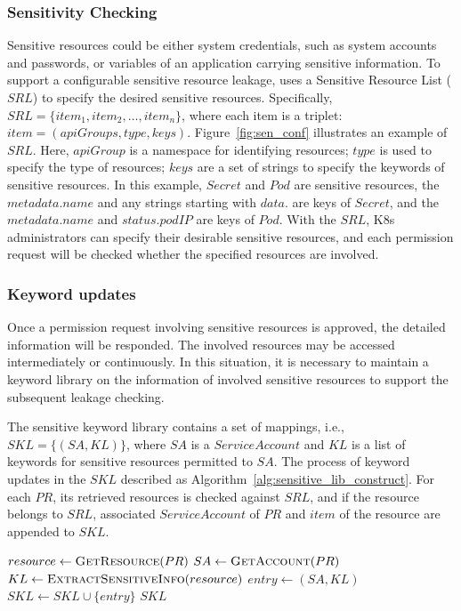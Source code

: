 \documentclass[conference]{IEEEtran}
\theoremstyle{definition}
\begin{document}
\subsubsection{Sensitivity Checking} Sensitive resources could be either system credentials, such as system accounts and passwords, or variables of an application carrying sensitive information. To support a configurable sensitive resource leakage, \kg uses a Sensitive Resource List ($SRL$) to specify the desired sensitive resources. Specifically, $SRL = \{item_1, item_2, \ldots, item_n\}$, where each item is a triplet: $item = (apiGroups, type, keys)$. Figure~\ref{fig:sen_conf} illustrates an example of $SRL$. Here, $apiGroup$ is a namespace for identifying resources; $type$ is used to specify the type of resources; $keys$ are a set of strings to specify the keywords of sensitive resources. In this example, $Secret$ and $Pod$ are sensitive resources, the $metadata.name$ and any strings starting with $data.$ are keys of $Secret$, and the $metadata.name$ and $status.podIP$ are keys of $Pod$. With the $SRL$, K8s administrators can specify their desirable sensitive resources, and each permission request will be checked whether the specified resources are involved. 


\subsubsection{Keyword updates}
Once a permission request involving sensitive resources is approved, the detailed information will be responded. The involved resources may be accessed intermediately or continuously. In this situation, it is necessary to maintain a keyword library on the information of involved sensitive resources to support the subsequent leakage checking.     

The sensitive keyword library contains a set of  mappings, i.e., $SKL = \{(SA, KL)\}$, where $SA$ is a $ServiceAccount$ and $KL$ is a list of keywords for sensitive resources permitted to $SA$. The process of keyword updates in the $SKL$ described as Algorithm~\ref{alg:sensitive_lib_construct}. For each $PR$, its retrieved resources is checked against $SRL$, and if the resource belongs to $SRL$, associated $ServiceAccount$ of $PR$ and $item$ of the resource are appended to $SKL$.

\begin{algorithm}[!hbt]
\caption{Keyword updates in the sensitive keyword library}
\label{alg:sensitive_lib_construct}
\begin{algorithmic}[1]
          \State $resource \gets \Call{GetResource}{PR}$
            \State $SA \gets \Call{GetAccount} {PR}$ 
            \State $KL \gets \Call{ExtractSensitiveInfo}{resource}$
            \State ${entry} \gets (SA, KL) $ 
            \State ${SKL} \gets {SKL} \cup \{entry\} $
        \EndIf
    \State \Return ${SKL}$
\end{algorithmic}
\end{algorithm}
\end{document}
